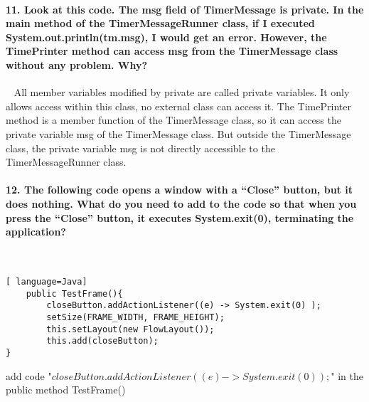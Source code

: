 \documentclass[12pt, leqno]{article}
\begin{document}
\paragraph*{11.	Look at this code. The msg field of TimerMessage is private. In the main method of the TimerMessageRunner class, if I executed System.out.println(tm.msg), I would get an error. However, the TimePrinter method can access msg from the TimerMessage class without any problem. Why?
}~{}
\newline\indent All member variables modified by private are called private variables. It only allows access within this class, no external class can access it. The TimePrinter method is a member function of the TimerMessage class, so it can access the private variable msg of the TimerMessage class. But outside the TimerMessage class, the private variable msg is not directly accessible to the TimerMessageRunner class.

\paragraph*{12.	The following code opens a window with a “Close” button, but it does nothing. What do you need to add to the code so that when you press the “Close” button, it executes System.exit(0), terminating the application?
}~{}
\begin{lstlisting}[ language=Java]
	public TestFrame(){
		closeButton.addActionListener((e) -> System.exit(0) );
		setSize(FRAME_WIDTH, FRAME_HEIGHT);
		this.setLayout(new FlowLayout());
		this.add(closeButton);
}
\end{lstlisting}
\indent add code "$closeButton.addActionListener((e) -> System.exit(0) );$" in the public method TestFrame()
\end{document}
